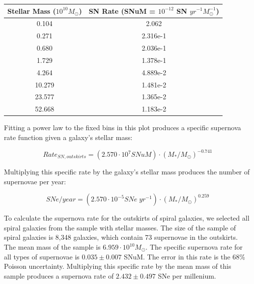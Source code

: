 \documentclass[apj]{emulateapj}
\begin{document}
\begin{table}

\begin{center}

  
  \begin{tabular}{| c | c |}
  \hline
    Stellar Mass ($10^{10} M_{\odot}$) & SN Rate \newline (SNuM = $10^{-12}$ SN $yr^{-1} M_{\odot}^{-1}$) \\
  \hline
    0.104 & 2.062 \\
    0.271 & 2.316e-1 \\
    0.680 & 2.036e-1 \\
    1.729 & 1.378e-1 \\
    4.264 & 4.889e-2 \\
    10.279 & 1.481e-2 \\
    23.577 & 1.365e-2 \\
    52.668 & 1.183e-2 \\
  \hline
  \end{tabular}
\end{center}

\end{table}

Fitting a power law to the fixed bins in this plot produces a specific supernova rate function given a galaxy's stellar mass:

\begin{equation}
Rate_{SN,outskirts}=(2.570 \cdot 10^7 SNuM) \cdot (M_*/M_{\odot})^{-0.741}
\end{equation}

Multiplying this specific rate by the galaxy's stellar mass produces the number of supernovae per year:

\begin{equation}
SNe/year=(2.570 \cdot 10^{-5} SNe\;yr^{-1}) \cdot (M_*/M_{\odot})^{0.259}
\end{equation}

To calculate the supernova rate for the outskirts of spiral galaxies, we selected all spiral galaxies from the sample with stellar masses. The size of the sample of spiral galaxies is 8,348 galaxies, which contain 73 supernovae in the outskirts. The mean mass of the sample is $6.959 \cdot 10^{10} M_{\odot}$. The specific supernova rate for all types of supernovae is $0.035 \pm 0.007$ SNuM. The error in this rate is the 68\% Poisson uncertainty. Multiplying this specific rate by the mean mass of this sample produces a supernova rate of $2.432 \pm 0.497$ SNe per millenium.
\end{document}
